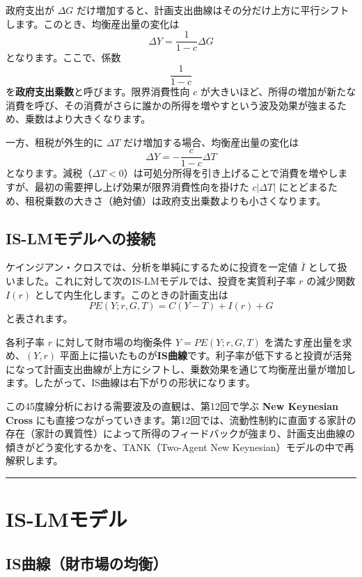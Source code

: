 \documentclass[
  japanese,
  lualatex,
  ja=standard,
  12pt,
  a4paper]{ltjsarticle}
\begin{document}
政府支出が \(\Delta G\)
だけ増加すると、計画支出曲線はその分だけ上方に平行シフトします。このとき、均衡産出量の変化は
\[
\Delta Y
=
\frac{1}{1-c}\Delta G
\] となります。ここで、係数 \[
\frac{1}{1-c}
\] を\textbf{政府支出乗数}と呼びます。限界消費性向 \(c\)
が大きいほど、所得の増加が新たな消費を呼び、その消費がさらに誰かの所得を増やすという波及効果が強まるため、乗数はより大きくなります。

一方、租税が外生的に \(\Delta T\) だけ増加する場合、均衡産出量の変化は
\[
\Delta Y
=
-
\frac{c}{1-c}\Delta T
\]
となります。減税（\(\Delta T < 0\)）は可処分所得を引き上げることで消費を増やしますが、最初の需要押し上げ効果が限界消費性向を掛けた
\(c|\Delta T|\)
にとどまるため、租税乗数の大きさ（絶対値）は政府支出乗数よりも小さくなります。

\subsection{IS-LMモデルへの接続}\label{is-lmux30e2ux30c7ux30ebux3078ux306eux63a5ux7d9a}

ケインジアン・クロスでは、分析を単純にするために投資を一定値 \(\bar{I}\)
として扱いました。これに対して次のIS-LMモデルでは、投資を実質利子率
\(r\) の減少関数 \(I(r)\) として内生化します。このときの計画支出は \[
PE(Y;r,G,T)=C(Y-T)+I(r)+G
\] と表されます。

各利子率 \(r\) に対して財市場の均衡条件 \(Y=PE(Y;r,G,T)\)
を満たす産出量を求め、\((Y, r)\)
平面上に描いたものが\textbf{IS曲線}です。利子率が低下すると投資が活発になって計画支出曲線が上方にシフトし、乗数効果を通じて均衡産出量が増加します。したがって、IS曲線は右下がりの形状になります。

この45度線分析における需要波及の直観は、第12回で学ぶ \textbf{New
Keynesian Cross}
にも直接つながっていきます。第12回では、流動性制約に直面する家計の存在（家計の異質性）によって所得のフィードバックが強まり、計画支出曲線の傾きがどう変化するかを、TANK（Two-Agent
New Keynesian）モデルの中で再解釈します。

\begin{center}\rule{0.5\linewidth}{0.5pt}\end{center}

\section{IS-LMモデル}\label{is-lmux30e2ux30c7ux30eb}

\subsection{IS曲線（財市場の均衡）}\label{isux66f2ux7ddaux8ca1ux5e02ux5834ux306eux5747ux8861}
\end{document}
